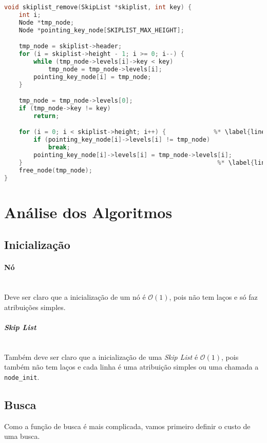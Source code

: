 \documentclass[paper=a4, fontsize=11pt]{scrartcl} %
\numberwithin{equation}{section}
\numberwithin{figure}{section}
\numberwithin{table}{section}
\numberwithin{definition}{section}
\numberwithin{theorem}{section}
\numberwithin{property}{section}
\numberwithin{proposition}{section}
\newcommand{\cO}{\ensuremath{\mathcal{O}}}
\newcommand{\SL}{\textit{Skip List}\xspace}
\begin{document}
\begin{lstlisting}[caption=Remoção., language=C]
void skiplist_remove(SkipList *skiplist, int key) {
    int i;
    Node *tmp_node;
    Node *pointing_key_node[SKIPLIST_MAX_HEIGHT];

    tmp_node = skiplist->header;
    for (i = skiplist->height - 1; i >= 0; i--) {
        while (tmp_node->levels[i]->key < key)
            tmp_node = tmp_node->levels[i];
        pointing_key_node[i] = tmp_node;
    }

    tmp_node = tmp_node->levels[0];
    if (tmp_node->key != key) 
        return;

    for (i = 0; i < skiplist->height; i++) {             %* \label{line:rem_p1} *)
        if (pointing_key_node[i]->levels[i] != tmp_node)
            break;
        pointing_key_node[i]->levels[i] = tmp_node->levels[i];
    }                                                     %* \label{line:rem_p2} *)
    free_node(tmp_node);
}

\end{lstlisting}


\section{Análise dos Algoritmos}

\subsection{Inicialização}

\paragraph{Nó}
\ \\ 
Deve ser claro que a inicialização de um nó é $\cO(1)$, pois não tem laços e só faz atribuições simples.

\paragraph{\SL}
\ \\
Também deve ser claro que a inicialização de uma \SL é $\cO(1)$, pois também não tem laços e cada linha é
uma atribuição simples ou uma chamada a \verb|node_init|.


\subsection{Busca}

Como a função de busca é mais complicada, vamos primeiro definir o custo de uma busca.
\end{document}
